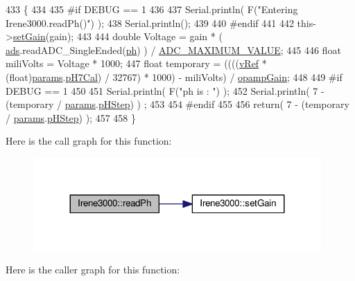 \begin{DoxyCode}
433 \{
434 
435 \textcolor{preprocessor}{#if DEBUG == 1 }
436 
437     Serial.println( F(\textcolor{stringliteral}{"Entering Irene3000.readPh()"}) );
438     Serial.println();
439 
440 \textcolor{preprocessor}{#endif }
441 
442     this->\hyperlink{classIrene3000_aff7c5da186b388e7272e63ff88a20c34}{setGain}(gain);
443 
444     \textcolor{keywordtype}{double} Voltage =  gain * ( \hyperlink{classIrene3000_a1215e77ba761c9908d80d691f149e135}{ads}.readADC\_SingleEnded(\hyperlink{Irene3000_8h_af771ceafe0e6524dd8497d4305dfe778}{ph}) ) / 
      \hyperlink{Irene3000_8h_ae04444a85a37b5dce09107f2ce2b2c80}{ADC\_MAXIMUM\_VALUE};
445 
446     \textcolor{keywordtype}{float} miliVolts = Voltage * 1000;
447     \textcolor{keywordtype}{float} temporary = ((((\hyperlink{classIrene3000_a018e7ff9bee57e6d2b298667a668ba7e}{vRef} * (float)\hyperlink{classIrene3000_a136585a5ee7f9ac6ab52175fa153f8e3}{params}.\hyperlink{structIrene3000_1_1parameters__T_a21265466a570d84bff914f26d2f7a03e}{pH7Cal}) / 32767) * 1000) - miliVolts) / 
      \hyperlink{classIrene3000_a4e588985ca74e5076029d5dee81034f2}{opampGain};
448 
449 \textcolor{preprocessor}{#if DEBUG == 1 }
450 
451     Serial.println( F(\textcolor{stringliteral}{"ph is : "}) );
452     Serial.println( 7 - (temporary / \hyperlink{classIrene3000_a136585a5ee7f9ac6ab52175fa153f8e3}{params}.\hyperlink{structIrene3000_1_1parameters__T_a61cfcc2539d5f630e9071f3753aba9fe}{pHStep}) ) ;
453 
454 \textcolor{preprocessor}{#endif }
455 
456     \textcolor{keywordflow}{return}( 7 - (temporary / \hyperlink{classIrene3000_a136585a5ee7f9ac6ab52175fa153f8e3}{params}.\hyperlink{structIrene3000_1_1parameters__T_a61cfcc2539d5f630e9071f3753aba9fe}{pHStep}) );
457 
458 \}
\end{DoxyCode}
Here is the call graph for this function\+:
\nopagebreak
\begin{figure}[H]
\begin{center}
\leavevmode
\includegraphics[width=311pt]{classIrene3000_abf3db725fabb0634ec889b32068a5eec_cgraph}
\end{center}
\end{figure}
Here is the caller graph for this function\+:

